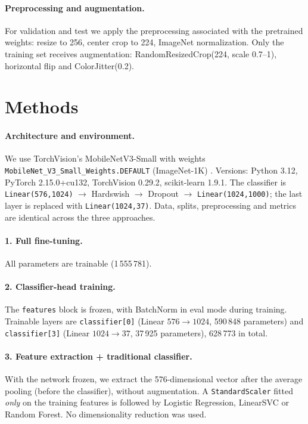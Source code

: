 \documentclass[11pt,a4paper]{article}
\begin{document}
\paragraph{Preprocessing and augmentation.} For validation and test we apply the preprocessing
associated with the pretrained weights: resize to 256, center crop to 224, ImageNet
normalization. Only the training set receives augmentation: RandomResizedCrop(224, scale
0.7--1), horizontal flip and ColorJitter(0.2).

\section{Methods}

\paragraph{Architecture and environment.} We use TorchVision's MobileNetV3-Small with weights
\texttt{MobileNet\_V3\_\allowbreak Small\_\allowbreak Weights.DEFAULT} (ImageNet-1K)
\cite{howard2019}. Versions: Python 3.12, PyTorch 2.15.0+cu132, TorchVision 0.29.2,
scikit-learn 1.9.1. The classifier is \texttt{Linear(576,1024)} $\to$ Hardswish $\to$ Dropout
$\to$ \texttt{Linear(1024,1000)}; the last layer is replaced with \texttt{Linear(1024,37)}.
Data, splits, preprocessing and metrics are identical across the three approaches.

\paragraph{1. Full fine-tuning.} All parameters are trainable (1\,555\,781).

\paragraph{2. Classifier-head training.} The \texttt{features} block is frozen, with BatchNorm
in eval mode during training. Trainable layers are \texttt{classifier[0]}
(Linear $576\to1024$, 590\,848 parameters) and \texttt{classifier[3]}
(Linear $1024\to37$, 37\,925 parameters), 628\,773 in total.

\paragraph{3. Feature extraction + traditional classifier.} With the network frozen, we extract
the 576-dimensional vector after the average pooling (before the classifier), without
augmentation. A \texttt{StandardScaler} fitted \emph{only} on the training features is
followed by Logistic Regression, LinearSVC or Random Forest. No dimensionality reduction was used.
\end{document}
